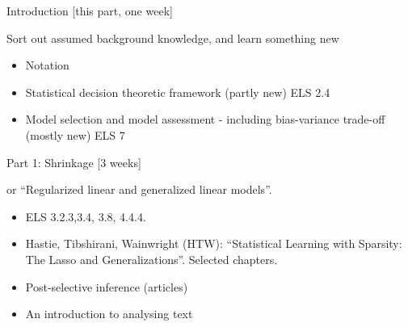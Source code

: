 \documentclass[
  ignorenonframetext,
]{beamer}
\providecommand{\tightlist}{%
  \setlength{\itemsep}{0pt}\setlength{\parskip}{0pt}}
\begin{document}
\begin{frame}

\begin{block}{Introduction {[}this part, one week{]}}

Sort out assumed background knowledge, and learn something new

\begin{itemize}
\tightlist
\item
  Notation
\item
  Statistical decision theoretic framework (partly new) ELS 2.4
\item
  Model selection and model assessment - including bias-variance
  trade-off (mostly new) ELS 7
\end{itemize}

\end{block}

\end{frame}

\begin{frame}

\begin{block}{Part 1: Shrinkage {[}3 weeks{]}}

or ``Regularized linear and generalized linear models''.

\begin{itemize}
\tightlist
\item
  ELS 3.2.3,3.4, 3.8, 4.4.4.
\item
  Hastie, Tibshirani, Wainwright (HTW): ``Statistical Learning with
  Sparsity: The Lasso and Generalizations''. Selected chapters.
\item
  Post-selective inference (articles)
\item
  An introduction to analysing text
\end{itemize}

\end{block}

\end{frame}
\end{document}
